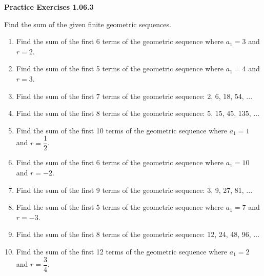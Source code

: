 \vspace{0.3ex}
\noindent\textbf{Practice Exercises 1.06.3}

\vspace{0.2ex}

Find the sum of the given finite geometric sequences.
\begin{enumerate}
    \item Find the sum of the first 6 terms of the geometric sequence where \( a_1 = 3 \) and \( r = 2 \).
    \item Find the sum of the first 5 terms of the geometric sequence where \( a_1 = 4 \) and \( r = 3 \).
    \item Find the sum of the first 7 terms of the geometric sequence: 2, 6, 18, 54, ...
    \item Find the sum of the first 8 terms of the geometric sequence: 5, 15, 45, 135, ...
    \item Find the sum of the first 10 terms of the geometric sequence where \( a_1 = 1 \) and \( r = \dfrac{1}{2} \).
    \item Find the sum of the first 6 terms of the geometric sequence where \( a_1 = 10 \) and \( r = -2 \).
    \item Find the sum of the first 9 terms of the geometric sequence: 3, 9, 27, 81, ...
    \item Find the sum of the first 5 terms of the geometric sequence where \( a_1 = 7 \) and \( r = -3 \).
    \item Find the sum of the first 8 terms of the geometric sequence: 12, 24, 48, 96, ...
    \item Find the sum of the first 12 terms of the geometric sequence where \( a_1 = 2 \) and \( r = \dfrac{3}{4} \).
\end{enumerate}
